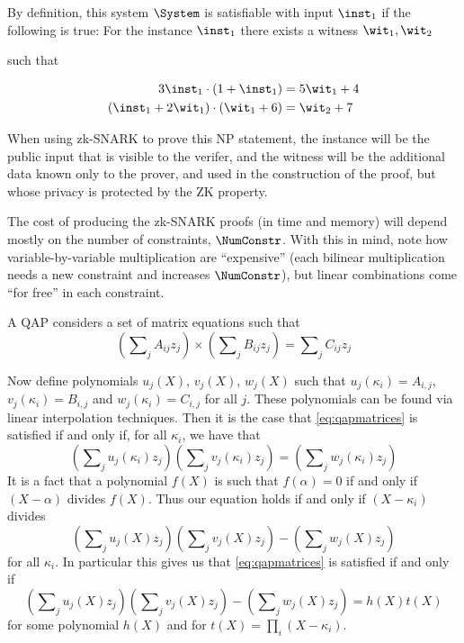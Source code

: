By definition, this system $\System$ is satisfiable with input $\inst_1$ if the following is true:
\NPstatementNOperiod
  {For the instance $\inst_1$}
  {there exists a witness $\wit_1,\wit_2$}
  {such that
  
  \vspace{-.75em}\begin{equation}
  \begin{aligned}
  3\inst_1 \cdot (1+\inst_1) &= 5\wit_1 + 4 \\
  (\inst_1 + 2\wit_1) \cdot (\wit_1+6) &= \wit_2 + 7  
  \end{aligned}
  \end{equation}
  }


When using zk-SNARK to prove this NP statement, the instance will be the public input that is visible to the verifer, and the witness will be the additional data known only to the prover, and used in the construction of the proof, but whose privacy is protected by the ZK property.


The cost of producing the zk-SNARK proofs (in time and memory) will depend mostly on the number of constraints, $\NumConstr$.
With this in mind, note how variable-by-variable multiplication are ``expensive'' (each bilinear multiplication needs a new constraint and increases $\NumConstr$), but linear combinations come ``for free'' in each constraint. 

\def\suma{\sum\nolimits}


A QAP considers a set of matrix equations such that
    \begin{equation}\label{eq:qapmatrices} \left( \suma_{j} A_{i j} z_j \right) \times \left( \suma_{j} B_{i j} z_j \right) = \suma_{j} C_{i j} z_j \end{equation}

Now define polynomials $u_j(X)$, $v_j(X)$, $w_j(X)$ such that $u_j(\kappa_i) = A_{i,j}$,  $v_j(\kappa_i) = B_{i,j}$ and  $w_j(\kappa_i) = C_{i,j}$ for all $j$.  These polynomials can be found via linear interpolation techniques.
Then it is the case that \cref{eq:qapmatrices} is satisfied if and only if, for all $\kappa_i$,
we have that 
\[ \left( \suma_{j}  u_j(\kappa_i) z_j \right)  \left( \suma_{j}  v_j(\kappa_i) z_j \right) =  \left( \suma_{j}  w_j(\kappa_i) z_j \right)   \]
It is a fact that a polynomial $f(X)$ is such that $f(\alpha) = 0$ if and only if $(X - \alpha)$ divides $f(X)$.
Thus our equation holds if and only if $(X - \kappa_i)$ divides 
\[ \left( \suma_{j}  u_j(X) z_j \right)  \left( \suma_{j}  v_j(X) z_j \right) -  \left( \suma_{j}  w_j(X) z_j \right)   \]
for all $\kappa_i$.
In particular this gives us that \cref{eq:qapmatrices} is satisfied if and only if
\[ \left( \suma_{j}  u_j(X) z_j \right)  \left( \suma_{j}  v_j(X) z_j \right) -  \left( \suma_{j}  w_j(X) z_j \right)   = h(X) t(X) \]
for some polynomial $h(X)$ and for $t(X) = \prod_i (X - \kappa_i)$.

